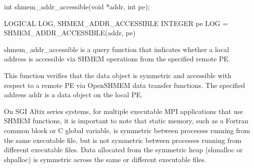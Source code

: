 
\synC
	  int shmem_addr_accessible(void *addr, int pe);

\synF
	  LOGICAL LOG, SHMEM_ADDR_ACCESSIBLE
	  INTEGER pe
	  LOG = SHMEM_ADDR_ACCESSIBLE(addr, pe)


{
       shmem\_addr\_accessible  is  a  query  function  that indicates whether a
       local address is accessible via SHMEM  operations  from	the  specified
       remote PE.
       
			 This function verifies that the data object is symmetric and accessible
       with respect to a remote PE via OpenSHMEM  data  transfer  functions.   The
       specified address addr is a data object on the local PE.

       On  SGI	Altix series systems, for multiple executable MPI applications
       that use SHMEM functions, it is important to note that  static  memory,
       such  as	 a  Fortran  common  block  or C global variable, is symmetric
       between processes running from the same executable  file,  but  is  not
       symmetric  between  processes  running from different executable files.
       Data allocated from  the	 symmetric  heap  (shmalloc  or	 shpalloc)  is
       symmetric across the same or different executable files.
}
{
		\desTB{}
		{
				\cRow{}{}
		}
		\notesB{
		}
}


\eAPI
